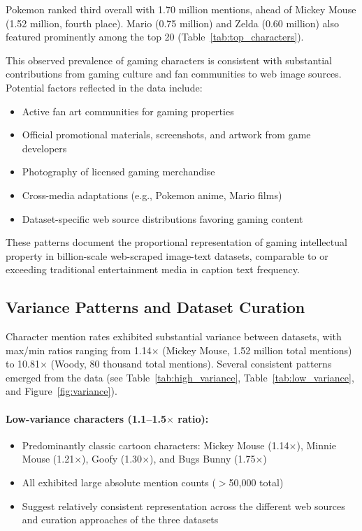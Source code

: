 \documentclass[11pt]{article}
\begin{document}
Pokemon ranked third overall with 1.70 million mentions, ahead of Mickey Mouse (1.52 million, fourth place). Mario (0.75 million) and Zelda (0.60 million) also featured prominently among the top 20 (Table~\ref{tab:top_characters}).

This observed prevalence of gaming characters is consistent with substantial contributions from gaming culture and fan communities to web image sources. Potential factors reflected in the data include:

\begin{itemize}
\item Active fan art communities for gaming properties
\item Official promotional materials, screenshots, and artwork from game developers
\item Photography of licensed gaming merchandise
\item Cross-media adaptations (e.g., Pokemon anime, Mario films)
\item Dataset-specific web source distributions favoring gaming content
\end{itemize}

These patterns document the proportional representation of gaming intellectual property in billion-scale web-scraped image-text datasets, comparable to or exceeding traditional entertainment media in caption text frequency.

\subsection{Variance Patterns and Dataset Curation}
Character mention rates exhibited substantial variance between datasets, with max/min ratios ranging from 1.14$\times$ (Mickey Mouse, 1.52 million total mentions) to 10.81$\times$ (Woody, 80 thousand total mentions). Several consistent patterns emerged from the data (see Table~\ref{tab:high_variance}, Table~\ref{tab:low_variance}, and Figure~\ref{fig:variance}).

\paragraph{Low-variance characters (1.1--1.5$\times$ ratio):}
\begin{itemize}
\item Predominantly classic cartoon characters: Mickey Mouse (1.14$\times$), Minnie Mouse (1.21$\times$), Goofy (1.30$\times$), and Bugs Bunny (1.75$\times$)
\item All exhibited large absolute mention counts ($>$50,000 total)
\item Suggest relatively consistent representation across the different web sources and curation approaches of the three datasets
\end{itemize}
\end{document}

